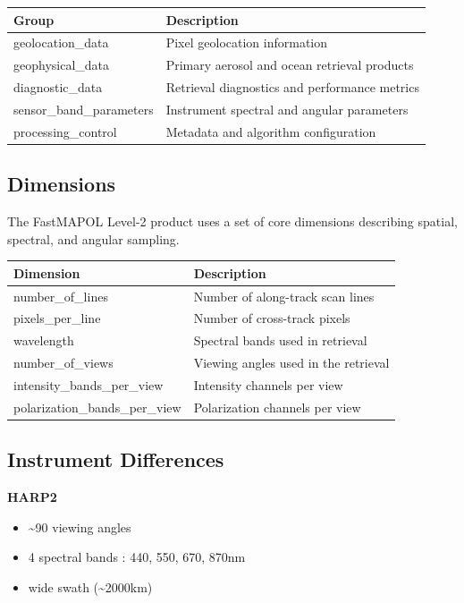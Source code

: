 \documentclass[
  letterpaper,
  open=any]{scrbook}
\providecommand{\tightlist}{%
  \setlength{\itemsep}{0pt}\setlength{\parskip}{0pt}}
\begin{document}
\begin{longtable}[]{@{}ll@{}}
\toprule\noalign{}
Group & Description \\
\midrule\noalign{}
\endhead
\bottomrule\noalign{}
\endlastfoot
geolocation\_data & Pixel geolocation information \\
geophysical\_data & Primary aerosol and ocean retrieval products \\
diagnostic\_data & Retrieval diagnostics and performance metrics \\
sensor\_band\_parameters & Instrument spectral and angular parameters \\
processing\_control & Metadata and algorithm configuration \\
\end{longtable}

\subsection{Dimensions}\label{dimensions}

The FastMAPOL Level-2 product uses a set of core dimensions describing
spatial, spectral, and angular sampling.

\begin{longtable}[]{@{}ll@{}}
\toprule\noalign{}
Dimension & Description \\
\midrule\noalign{}
\endhead
\bottomrule\noalign{}
\endlastfoot
number\_of\_lines & Number of along-track scan lines \\
pixels\_per\_line & Number of cross-track pixels \\
wavelength & Spectral bands used in retrieval \\
number\_of\_views & Viewing angles used in the retrieval \\
intensity\_bands\_per\_view & Intensity channels per view \\
polarization\_bands\_per\_view & Polarization channels per view \\
\end{longtable}

\subsection{Instrument Differences}\label{instrument-differences}

\textbf{HARP2}

\begin{itemize}
\tightlist
\item
  \textasciitilde90 viewing angles\\
\item
  4 spectral bands : 440, 550, 670, 870nm
\item
  wide swath (\textasciitilde2000km)
\end{itemize}
\end{document}
